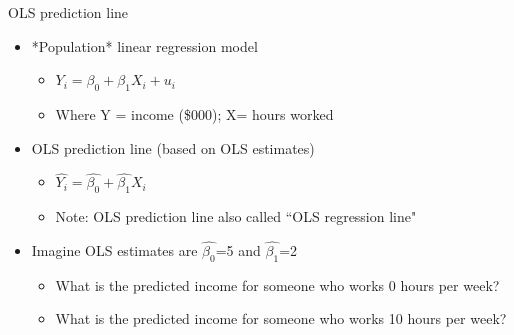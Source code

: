 \begin{frame}{OLS prediction line}
	\begin{itemize}
	\item *Population* linear regression model
		\begin{itemize}
		\item $Y_{i} = \beta_{0} + \beta_{1}X_{i} + u_{i}$
		\item Where Y =  income (\$000); X= hours worked
		\end{itemize}
	\item OLS prediction line (based on OLS estimates)
		\begin{itemize}
		\item $\hat{Y_{i}} = \hat{\beta_{0}} + \hat{\beta_{1}}X_{i}$
		\item Note: OLS prediction line also called ``OLS regression line"
		\end{itemize}
	\item Imagine OLS estimates are $\hat{\beta_{0}}$=5 and $\hat{\beta_{1}}$=2
		\begin{itemize}
		\item What is the predicted income for someone who works 0 hours per week?
		\item What is the predicted income for someone who works 10 hours per week?
		\end{itemize}
	\end{itemize}
\end{frame}


